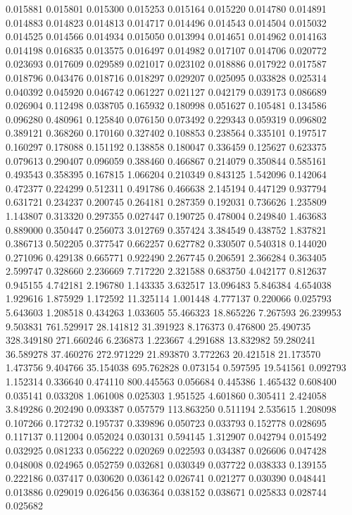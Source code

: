 0.015881
0.015801
0.015300
0.015253
0.015164
0.015220
0.014780
0.014891
0.014883
0.014823
0.014813
0.014717
0.014496
0.014543
0.014504
0.015032
0.014525
0.014566
0.014934
0.015050
0.013994
0.014651
0.014962
0.014163
0.014198
0.016835
0.013575
0.016497
0.014982
0.017107
0.014706
0.020772
0.023693
0.017609
0.029589
0.021017
0.023102
0.018886
0.017922
0.017587
0.018796
0.043476
0.018716
0.018297
0.029207
0.025095
0.033828
0.025314
0.040392
0.045920
0.046742
0.061227
0.021127
0.042179
0.039173
0.086689
0.026904
0.112498
0.038705
0.165932
0.180998
0.051627
0.105481
0.134586
0.096280
0.480961
0.125840
0.076150
0.073492
0.229343
0.059319
0.096802
0.389121
0.368260
0.170160
0.327402
0.108853
0.238564
0.335101
0.197517
0.160297
0.178088
0.151192
0.138858
0.180047
0.336459
0.125627
0.623375
0.079613
0.290407
0.096059
0.388460
0.466867
0.214079
0.350844
0.585161
0.493543
0.358395
0.167815
1.066204
0.210349
0.843125
1.542096
0.142064
0.472377
0.224299
0.512311
0.491786
0.466638
2.145194
0.447129
0.937794
0.631721
0.234237
0.200745
0.264181
0.287359
0.192031
0.736626
1.235809
1.143807
0.313320
0.297355
0.027447
0.190725
0.478004
0.249840
1.463683
0.889000
0.350447
0.256073
3.012769
0.357424
3.384549
0.438752
1.837821
0.386713
0.502205
0.377547
0.662257
0.627782
0.330507
0.540318
0.144020
0.271096
0.429138
0.665771
0.922490
2.267745
0.206591
2.366284
0.363405
2.599747
0.328660
2.236669
7.717220
2.321588
0.683750
4.042177
0.812637
0.945155
4.742181
2.196780
1.143335
3.632517
13.096483
5.846384
4.654038
1.929616
1.875929
1.172592
11.325114
1.001448
4.777137
0.220066
0.025793
5.643603
1.208518
0.434263
1.033605
55.466323
18.865226
7.267593
26.239953
9.503831
761.529917
28.141812
31.391923
8.176373
0.476800
25.490735
328.349180
271.660246
6.236873
1.223667
4.291688
13.832982
59.280241
36.589278
37.460276
272.971229
21.893870
3.772263
20.421518
21.173570
1.473756
9.404766
35.154038
695.762828
0.073154
0.597595
19.541561
0.092793
1.152314
0.336640
0.474110
800.445563
0.056684
0.445386
1.465432
0.608400
0.035141
0.033208
1.061008
0.025303
1.951525
4.601860
0.305411
2.424058
3.849286
0.202490
0.093387
0.057579
113.863250
0.511194
2.535615
1.208098
0.107266
0.172732
0.195737
0.339896
0.050723
0.033793
0.152778
0.028695
0.117137
0.112004
0.052024
0.030131
0.594145
1.312907
0.042794
0.015492
0.032925
0.081233
0.056222
0.020269
0.022593
0.034387
0.026606
0.047428
0.048008
0.024965
0.052759
0.032681
0.030349
0.037722
0.038333
0.139155
0.222186
0.037417
0.030620
0.036142
0.026741
0.021277
0.030390
0.048441
0.013886
0.029019
0.026456
0.036364
0.038152
0.038671
0.025833
0.028744
0.025682
